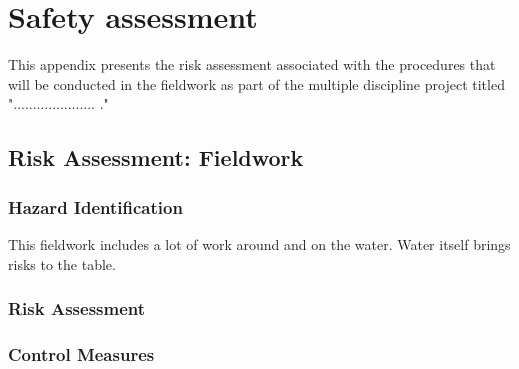 
\chapter{Safety assessment}

This appendix presents the risk assessment associated with the procedures that will be conducted in the fieldwork as part of the multiple discipline project titled "..................... ."

\section{Risk Assessment: Fieldwork}

\subsection{Hazard Identification}
This fieldwork includes a lot of work around and on the water. Water itself brings risks to the table. 


\subsection{Risk Assessment}



\subsection{Control Measures}